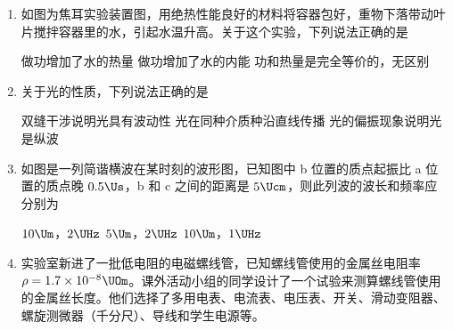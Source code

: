 \documentclass[\gkver]{gaokaozhenti}
\begin{document}
\begin{enumerate}

\item
如图为焦耳实验装置图，用绝热性能良好的材料将容器包好，重物下落带动叶片搅拌容器里的水，引起水温升高。关于这个实验，下列说法正确的是


{做功增加了水的热量}
{做功增加了水的内能}
{功和热量是完全等价的，无区别}


\item
关于光的性质，下列说法正确的是

{双缝干涉说明光具有波动性}
{光在同种介质种沿直线传播}
{光的偏振现象说明光是纵波}


\item
如图是一列简谐横波在某时刻的波形图，已知图中 b 位置的质点起振比 a 位置的质点晚 $0.5\Us$，b 和 c 之间的距离是 $5\Ucm$，则此列波的波长和频率应分别为


{$10\Um$，$2\UHz$}
{$5\Um$，$2\UHz$}
{$10\Um$，$1\UHz$}


\item
实验室新进了一批低电阻的电磁螺线管，已知螺线管使用的金属丝电阻率 $\rho=1.7\times10^{-8}\UOm$。课外活动小组的同学设计了一个试验来测算螺线管使用的金属丝长度。他们选择了多用电表、电流表、电压表、开关、滑动变阻器、螺旋测微器（千分尺）、导线和学生电源等。


\end{enumerate}
\end{document}
